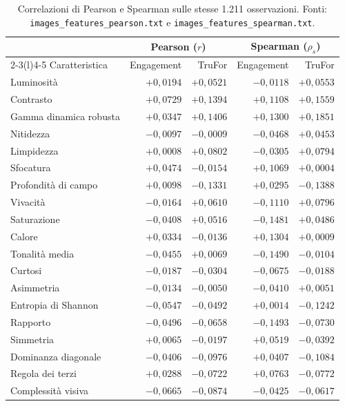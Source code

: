 \begin{table}[htbp]
    \centering
    \small
    \caption{Correlazioni di Pearson e Spearman sulle stesse 1.211 osservazioni. Fonti: \texttt{images\_features\_pearson.txt} e \texttt{images\_features\_spearman.txt}.}
    \label{tab:risultati-feature-correlazioni}
    \begin{tabular}{@{}lrrrr@{}}
        \toprule
        & \multicolumn{2}{c}{Pearson ($r$)} & \multicolumn{2}{c}{Spearman ($\rho_s$)} \\
        \cmidrule(lr){2-3}\cmidrule(l){4-5}
        Caratteristica & Engagement & TruFor & Engagement & TruFor \\
        \midrule
        Luminosità & $+0{,}0194$ & $+0{,}0521$ & $-0{,}0118$ & $+0{,}0553$ \\
        Contrasto & $+0{,}0729$ & $+0{,}1394$ & $+0{,}1108$ & $+0{,}1559$ \\
        Gamma dinamica robusta & $+0{,}0347$ & $+0{,}1406$ & $+0{,}1300$ & $+0{,}1851$ \\
        Nitidezza & $-0{,}0097$ & $-0{,}0009$ & $-0{,}0468$ & $+0{,}0453$ \\
        Limpidezza & $+0{,}0008$ & $+0{,}0802$ & $-0{,}0305$ & $+0{,}0794$ \\
        Sfocatura & $+0{,}0474$ & $-0{,}0154$ & $+0{,}1069$ & $+0{,}0004$ \\
        Profondità di campo & $+0{,}0098$ & $-0{,}1331$ & $+0{,}0295$ & $-0{,}1388$ \\
        Vivacità & $-0{,}0164$ & $+0{,}0610$ & $-0{,}1110$ & $+0{,}0796$ \\
        Saturazione & $-0{,}0408$ & $+0{,}0516$ & $-0{,}1481$ & $+0{,}0486$ \\
        Calore & $+0{,}0334$ & $-0{,}0136$ & $+0{,}1304$ & $+0{,}0009$ \\
        Tonalità media & $-0{,}0455$ & $+0{,}0069$ & $-0{,}1490$ & $-0{,}0104$ \\
        Curtosi & $-0{,}0187$ & $-0{,}0304$ & $-0{,}0675$ & $-0{,}0188$ \\
        Asimmetria & $-0{,}0134$ & $-0{,}0050$ & $-0{,}0410$ & $+0{,}0051$ \\
        Entropia di Shannon & $-0{,}0547$ & $-0{,}0492$ & $+0{,}0014$ & $-0{,}1242$ \\
        Rapporto & $-0{,}0496$ & $-0{,}0658$ & $-0{,}1493$ & $-0{,}0730$ \\
        Simmetria & $+0{,}0065$ & $-0{,}0197$ & $+0{,}0519$ & $-0{,}0392$ \\
        Dominanza diagonale & $-0{,}0406$ & $-0{,}0976$ & $+0{,}0407$ & $-0{,}1084$ \\
        Regola dei terzi & $+0{,}0288$ & $-0{,}0722$ & $+0{,}0763$ & $-0{,}0772$ \\
        Complessità visiva & $-0{,}0665$ & $-0{,}0874$ & $-0{,}0425$ & $-0{,}0617$ \\
        \bottomrule
    \end{tabular}
\end{table}

